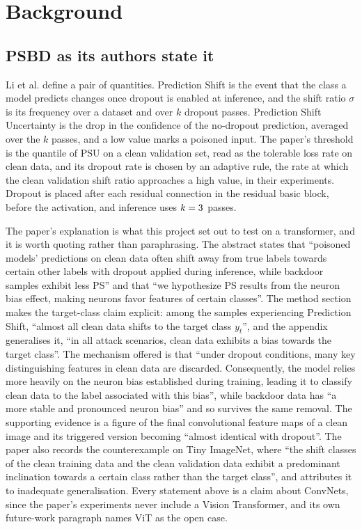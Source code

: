 \documentclass[../main.tex]{subfiles}
\begin{document}
\section{Background}

\subsection{PSBD as its authors state it}

Li et al. \citep{li2025psbd} define a pair of quantities. Prediction Shift is the event that the class a model predicts changes once dropout is enabled at inference, and the shift ratio $\sigma$ is its frequency over a dataset and over $k$ dropout passes. Prediction Shift Uncertainty is the drop in the confidence of the no-dropout prediction, averaged over the $k$ passes, and a low value marks a poisoned input. The paper's threshold is the \HeadlineQuantilePercent{} quantile of PSU on a clean validation set, read as the tolerable loss rate on clean data, and its dropout rate is chosen by an adaptive rule, the rate at which the clean validation shift ratio approaches a high value, \AdaptiveShiftTarget{} in their experiments. Dropout is placed after each residual connection in the residual basic block, before the activation, and inference uses $k = 3$ passes.

The paper's explanation is what this project set out to test on a transformer, and it is worth quoting rather than paraphrasing. The abstract states that ``poisoned models' predictions on clean data often shift away from true labels towards certain other labels with dropout applied during inference, while backdoor samples exhibit less PS'' and that ``we hypothesize PS results from the neuron bias effect, making neurons favor features of certain classes''. The method section makes the target-class claim explicit: among the samples experiencing Prediction Shift, ``almost all clean data shifts to the target class $y_t$'', and the appendix generalises it, ``in all attack scenarios, clean data exhibits a bias towards the target class''. The mechanism offered is that ``under dropout conditions, many key distinguishing features in clean data are discarded. Consequently, the model relies more heavily on the neuron bias established during training, leading it to classify clean data to the label associated with this bias'', while backdoor data has ``a more stable and pronounced neuron bias'' and so survives the same removal. The supporting evidence is a figure of the final convolutional feature maps of a clean image and its triggered version becoming ``almost identical with dropout''. The paper also records the counterexample on Tiny ImageNet, where ``the shift classes of the clean training data and the clean validation data exhibit a predominant inclination towards a certain class rather than the target class'', and attributes it to inadequate generalisation. Every statement above is a claim about ConvNets, since the paper's experiments never include a Vision Transformer, and its own future-work paragraph names ViT as the open case.
\end{document}
